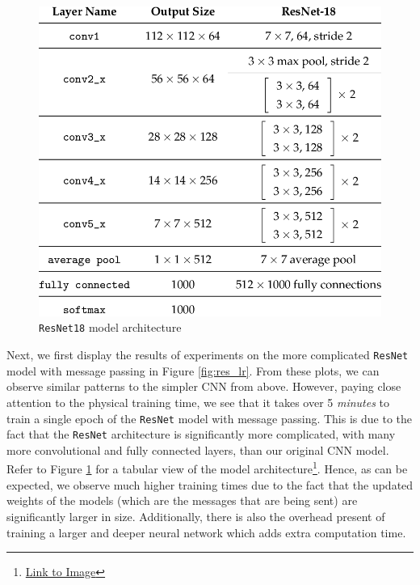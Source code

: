 \documentclass{article}
\begin{document}
\begin{figure}[!h]
    \centering
    \includegraphics[scale=0.25]{res18}
    \caption{\texttt{ResNet18} model architecture}
    \label{fig:res18}
\end{figure}

Next, we first display the results of experiments on the more complicated \texttt{ResNet} model with message passing in Figure \ref{fig:res_lr}. From these plots, we can observe similar patterns to the simpler CNN from above. However, paying close attention to the physical training time, we see that it takes over 5 \textit{minutes} to train a single epoch of the \texttt{ResNet} model with message passing. This is due to the fact that the \texttt{ResNet} architecture is significantly more complicated, with many more convolutional and fully connected layers, than our original CNN model. Refer to Figure \ref{fig:res18} for a tabular view of the model architecture\footnote{\href{https://www.researchgate.net/figure/ResNet-18-Architecture_tbl1_322476121}{Link to Image}}. Hence, as can be expected, we observe much higher training times due to the fact that the updated weights of the models (which are the messages that are being sent) are significantly larger in size. Additionally, there is also the overhead present of training a larger and deeper neural network which adds extra computation time.
\end{document}
